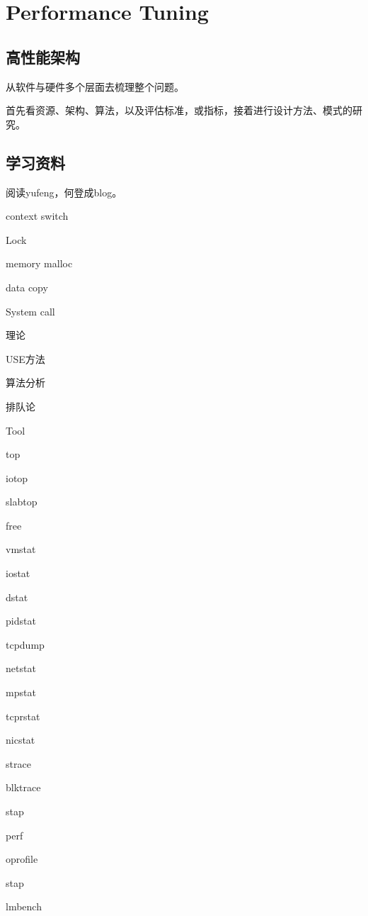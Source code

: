 \chapter{Performance Tuning}

\section{高性能架构}

从软件与硬件多个层面去梳理整个问题。

首先看资源、架构、算法，以及评估标准，或指标，接着进行设计方法、模式的研究。

\section{学习资料}

阅读yufeng，何登成blog。

\begin{enumbox}
\item context switch 
\item Lock 
\item memory malloc
\item data copy
\item System call 
\end{enumbox}

理论
\begin{enumbox}
\item USE方法
\item 算法分析
\item 排队论
\end{enumbox}

Tool
\begin{enumbox}
\item top
\item iotop
\item slabtop
\item free
\item vmstat
\item iostat
\item dstat
\item pidstat
\item *
\item tcpdump
\item netstat
\item mpstat
\item tcprstat
\item nicstat
\item *
\item strace
\item blktrace
\item stap
\item perf
\item oprofile
\item stap
\item lmbench
\end{enumbox}
